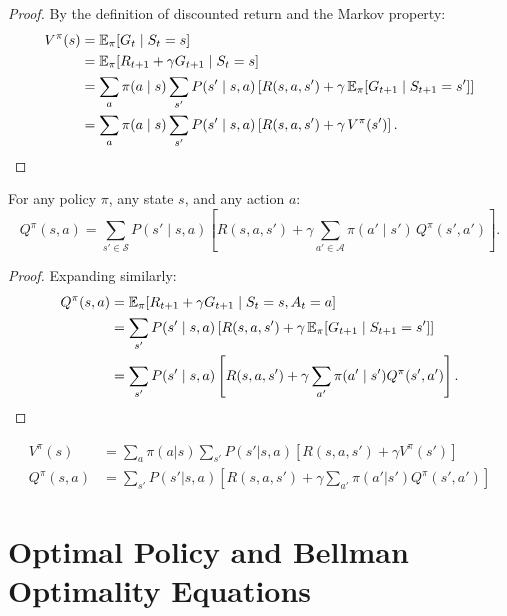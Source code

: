 \begin{proof}
By the definition of discounted return and the Markov property:
\begin{align*}
    V^\pi(s) &= \mathbb{E}_\pi[G_t \mid S_t = s] \\
    &= \mathbb{E}_\pi[R_{t+1} + \gamma G_{t+1} \mid S_t = s] \\
    &= \sum_{a} \pi(a \mid s) \sum_{s'} P(s' \mid s, a)
       \left[ R(s, a, s') + \gamma \, \mathbb{E}_\pi[G_{t+1} \mid S_{t+1} = s'] \right] \\
    &= \sum_{a} \pi(a \mid s) \sum_{s'} P(s' \mid s, a)
       \left[ R(s, a, s') + \gamma \, V^\pi(s') \right]. \qedhere
\end{align*}
\end{proof}

\begin{theorem}
For any policy $\pi$, any state $s$, and any action $a$:
\[
    Q^\pi(s, a) = \sum_{s' \in \mathcal{S}} P(s' \mid s, a)
    \left[ R(s, a, s') + \gamma \sum_{a' \in \mathcal{A}} \pi(a' \mid s') \, Q^\pi(s', a') \right].
\]
\end{theorem}

\begin{proof}
Expanding similarly:
\begin{align*}
    Q^\pi(s, a) &= \mathbb{E}_\pi[R_{t+1} + \gamma G_{t+1} \mid S_t = s, A_t = a] \\
    &= \sum_{s'} P(s' \mid s, a) \left[ R(s, a, s') +
       \gamma \, \mathbb{E}_\pi[G_{t+1} \mid S_{t+1} = s'] \right] \\
    &= \sum_{s'} P(s' \mid s, a) \left[ R(s, a, s') +
       \gamma \sum_{a'} \pi(a' \mid s') Q^\pi(s', a') \right]. \qedhere
\end{align*}
\end{proof}

\begin{keyformulas}[title=\textbf{Bellman Equations --- Summary}]
\begin{align}
    V^\pi(s) &= \sum_a \pi(a|s) \sum_{s'} P(s'|s,a)[R(s,a,s') + \gamma V^\pi(s')]
    \label{eq:bellman_v} \\
    Q^\pi(s,a) &= \sum_{s'} P(s'|s,a)[R(s,a,s') + \gamma \sum_{a'} \pi(a'|s') Q^\pi(s',a')]
    \label{eq:bellman_q}
\end{align}
\end{keyformulas}

\section{Optimal Policy and Bellman Optimality Equations}


